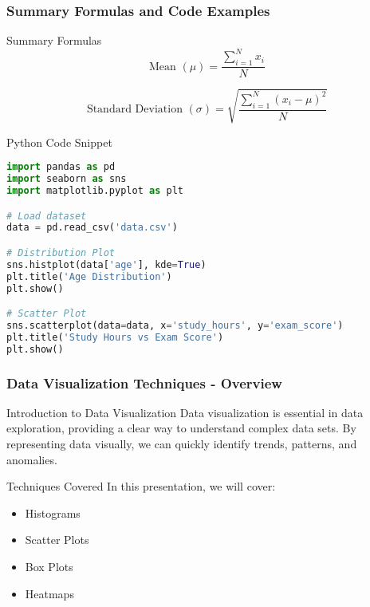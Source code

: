 \documentclass[aspectratio=169]{beamer}
\begin{document}
\begin{frame}[fragile]
    \frametitle{Summary Formulas and Code Examples}

    \begin{block}{Summary Formulas}
        \begin{equation}
        \text{Mean } (\mu) = \frac{\sum_{i=1}^{N} x_i}{N}
        \end{equation}
        
        \begin{equation}
        \text{Standard Deviation } (\sigma) = \sqrt{\frac{\sum_{i=1}^{N} (x_i - \mu)^2}{N}}
        \end{equation}
    \end{block}

    \begin{block}{Python Code Snippet}
        \begin{lstlisting}[language=Python]
import pandas as pd
import seaborn as sns
import matplotlib.pyplot as plt

# Load dataset
data = pd.read_csv('data.csv')

# Distribution Plot
sns.histplot(data['age'], kde=True)
plt.title('Age Distribution')
plt.show()

# Scatter Plot
sns.scatterplot(data=data, x='study_hours', y='exam_score')
plt.title('Study Hours vs Exam Score')
plt.show()
        \end{lstlisting}
    \end{block}
\end{frame}

\begin{frame}[fragile]
    \frametitle{Data Visualization Techniques - Overview}
    \begin{block}{Introduction to Data Visualization}
        Data visualization is essential in data exploration, providing a clear way to understand complex data sets. 
        By representing data visually, we can quickly identify trends, patterns, and anomalies.
    \end{block}
    \begin{block}{Techniques Covered}
        In this presentation, we will cover:
        \begin{itemize}
            \item Histograms
            \item Scatter Plots
            \item Box Plots
            \item Heatmaps
        \end{itemize}
    \end{block}
\end{frame}
\end{document}
